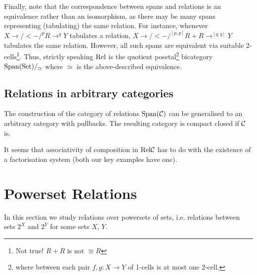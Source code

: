 Finally, note that the
correspondence between spans and relations is an equivalence rather
than an isomorphism, as there may be many spans representing
(tabulating) the
same relation. For instance, whenever $X \to/<-/^p R \to^q Y$ tabulates a
relation, $X \to/<-/^{[p,p]} R + R \to^{[q,q]} Y$ tabulates the same relation.
However, all such spans are equivalent via suitable
2-cells\footnote{Not true! $R+R$ is not $\cong R$}. Thus, strictly speaking $\mathrm{Rel}$ is the quotient
posetal\footnote{where between each pair $f,g : X \to Y$ of 1-cells is
  at most one 2-cell.}
bicategory $\mathrm{Span}(\mathrm{Set})/_\simeq$ where
$\simeq$ is the above-described equivalence.

%
\subsection{Relations in arbitrary categories}
The construction of the category of relations $\mathrm{Span}(\mathcal{C})$ can be
generalised to an arbitrary category with pullbacks. The resulting category is
compact closed if $\mathcal{C}$ is. 

\begin{remark}It seems that associativity of composition in
  $\mathrm{Rel}{\mathcal{C}}$ has to do with the existence of a factorisation system
  (both our key examples have one). 
\end{remark}


\section{Powerset Relations}
In this section we study relations over powersets of sets,
i.e. relations between sets $2^X$ and $2^Y$ for some sets $X$, $Y$.


